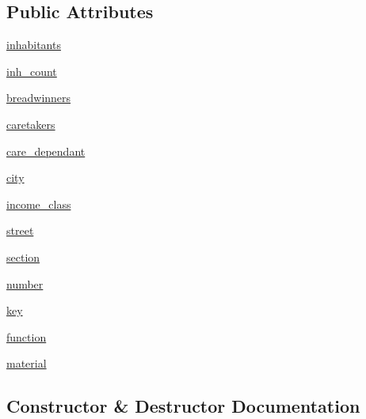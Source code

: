 \subsection*{Public Attributes}
\begin{DoxyCompactItemize}
\item 
\hyperlink{classclasses_1_1house_1_1House_a577435fea023f4493335765065e4ff89}{inhabitants}
\item 
\hyperlink{classclasses_1_1house_1_1House_a5d00d41c32eb94a632e69f3966b686cd}{inh\+\_\+count}
\item 
\hyperlink{classclasses_1_1house_1_1House_acc9017378b83d3fb622aaf53e62da232}{breadwinners}
\item 
\hyperlink{classclasses_1_1house_1_1House_a0d7fe7dd2075542042d87003dd4771a4}{caretakers}
\item 
\hyperlink{classclasses_1_1house_1_1House_a9254784e785afab49cb81fc13dd24689}{care\+\_\+dependant}
\item 
\hyperlink{classclasses_1_1house_1_1House_a9be99bcd61afbb7df6cddef1aad45e86}{city}
\item 
\hyperlink{classclasses_1_1house_1_1House_a6718c593b30139ac25f3f1e485ba8f15}{income\+\_\+class}
\item 
\hyperlink{classclasses_1_1house_1_1House_a73269c98a96b8b15efc85c1f8001af63}{street}
\item 
\hyperlink{classclasses_1_1house_1_1House_af840a6baf655e205bbf5aa4dfbc622ef}{section}
\item 
\hyperlink{classclasses_1_1house_1_1House_a8bcc1513617107cd48ebac9c51c49b35}{number}
\item 
\hyperlink{classclasses_1_1house_1_1House_a164bd96b26aad5ac106b447cf4b93cce}{key}
\item 
\hyperlink{classclasses_1_1house_1_1House_aa8a07d4b06323f0f724c278602074c6a}{function}
\item 
\hyperlink{classclasses_1_1house_1_1House_a1b65cfb084c1d75d5ddf0b9c333db701}{material}
\end{DoxyCompactItemize}


\subsection{Constructor \& Destructor Documentation}
\mbox{\label{classclasses_1_1house_1_1House_aff02285c20463b96120bd06ad62bf850}} 
